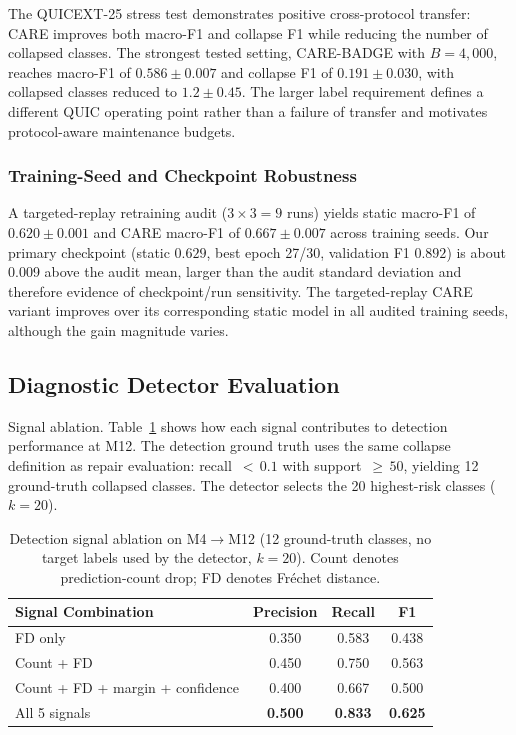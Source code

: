 \documentclass[preprint,12pt,authoryear]{elsarticle}
\newcommand{\ours}{CARE}  %
\begin{document}
The QUICEXT-25 stress test demonstrates positive cross-protocol transfer: \ours{} improves both macro-F1 and collapse F1 while reducing the number of collapsed classes. The strongest tested setting, \ours{}-BADGE with $B{=}4{,}000$, reaches macro-F1 of $0.586{\pm}0.007$ and collapse F1 of $0.191{\pm}0.030$, with collapsed classes reduced to $1.2{\pm}0.45$. The larger label requirement defines a different QUIC operating point rather than a failure of transfer and motivates protocol-aware maintenance budgets.

\subsubsection{Training-Seed and Checkpoint Robustness}
\label{sec:checkpoint_robustness}

A targeted-replay retraining audit ($3{\times}3{=}9$ runs) yields static macro-F1 of $0.620{\pm}0.001$ and CARE macro-F1 of $0.667{\pm}0.007$ across training seeds.
Our primary checkpoint (static $0.629$, best epoch 27/30, validation F1 $0.892$) is about 0.009 above the audit mean, larger than the audit standard deviation and therefore evidence of checkpoint/run sensitivity. The targeted-replay CARE variant improves over its corresponding static model in all audited training seeds, although the gain magnitude varies.

\subsection{Diagnostic Detector Evaluation}
\label{sec:detection_eval}

Signal ablation.
Table~\ref{tab:detect_signals} shows how each signal contributes to detection performance at M12.
The detection ground truth uses the same collapse definition as repair evaluation: recall~${<}\,0.1$ with support~${\geq}\,50$, yielding 12 ground-truth collapsed classes.
The detector selects the 20 highest-risk classes ($k{=}20$).

\begin{table}[!htbp]
\centering
\caption{Detection signal ablation on M4$\to$M12 (12 ground-truth classes, no target labels used by the detector, $k{=}20$). Count denotes prediction-count drop; FD denotes Fr\'{e}chet distance.}
\label{tab:detect_signals}
\small
\begin{tabular}{@{}l ccc@{}}
\toprule
Signal Combination & Precision & Recall & F1 \\
\midrule
FD only & 0.350 & 0.583 & 0.438 \\
Count + FD & 0.450 & 0.750 & 0.563 \\
Count + FD + margin + confidence & 0.400 & 0.667 & 0.500 \\
All 5 signals & \textbf{0.500} & \textbf{0.833} & \textbf{0.625} \\
\bottomrule
\end{tabular}
\end{table}
\end{document}
